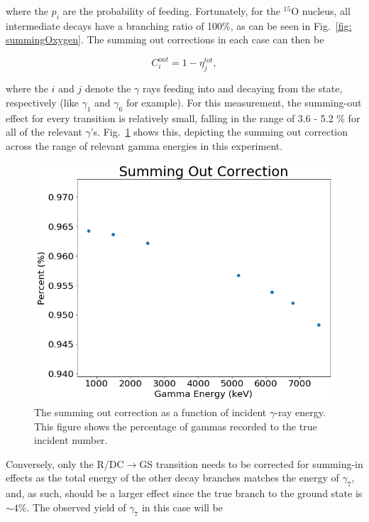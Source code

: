 \noindent where the $p_{i}$ are the probability of feeding. Fortunately, for the $^{15}$O nucleus, all intermediate decays have a branching ratio of 100\%, as can be seen in Fig.\ \ref{fig: summingOxygen}. The summing out corrections in each case can then be

\begin{equation}
C_{i}^{out} = 1 - \eta^{tot}_{j},
\end{equation}

\noindent where the $i$ and $j$ denote the $\gamma$ rays feeding into and decaying from the state, respectively (like $\gamma_{1}$ and $\gamma_{6}$ for example). For this measurement, the summing-out effect for every transition is relatively small, falling in the range of 3.6 - 5.2 \% for all of the relevant $\gamma$'s. Fig.\ \ref{fig: sumOutRange} shows this, depicting the summing out correction across the range of relevant gamma energies in this experiment. 


\begin{figure}
		\includegraphics[width=1.0\linewidth]{figures/sumOutRange.png}
	\caption[The summing out correction as a function of incident $\gamma$-ray energy. This figure shows the percentage of gammas recorded to the true incident number.]
	{{\small The summing out correction as a function of incident $\gamma$-ray energy. This figure shows the percentage of gammas recorded to the true incident number.}}
	\label{fig: sumOutRange}
\end{figure}


Conversely, only the R/DC$\rightarrow$GS transition needs to be corrected for summing-in effects as the total energy of the other decay branches matches the energy of $\gamma_{7}$, and, as such, should be a larger effect since the true branch to the ground state is $\sim 4$\%. The observed yield of $\gamma_{7}$ in this case will be

